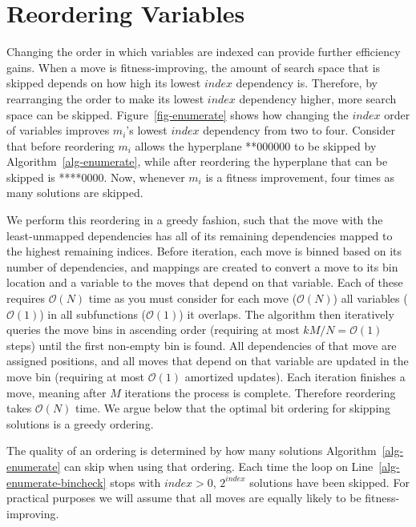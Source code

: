 \documentclass[runningheads,a4paper]{llncs}
\newcommand{\BigO}[1]{$\mathcal{O}{(#1)}$}
\begin{document}
\section{Reordering Variables}
\label{sec-reorder}
Changing the order in which variables are indexed can provide further efficiency gains.
When a move is fitness-improving,
the amount of search space that is skipped depends on how high its lowest $index$ dependency is. Therefore,
by rearranging the order to make its lowest $index$ dependency higher, more search space can be skipped. 
Figure~\ref{fig-enumerate} shows how changing the $index$ order of variables
improves $m_i$'s lowest $index$ dependency from two to four. Consider that before reordering $m_i$ allows the hyperplane
**000000 to be skipped by Algorithm~\ref{alg-enumerate}, while after reordering the hyperplane that can be skipped is ****0000.
Now, whenever $m_i$ is a fitness improvement, four times as many solutions are skipped.

We perform this reordering in a greedy fashion, such that the move with the
least-unmapped dependencies has all of its remaining dependencies mapped to the
highest remaining indices.
Before iteration, each move is binned based on its number of dependencies, and mappings
are created to convert a move to its bin location and a variable to the
moves that depend on that variable. Each of these requires \BigO{N} time
as you must consider for each move (\BigO{N}) all variables (\BigO{1})
in all subfunctions (\BigO{1}) it overlaps.
The algorithm then iteratively queries the move bins in ascending order
(requiring at most $kM/N=$\BigO{1} steps) until the first non-empty bin
is found. All dependencies of that move are assigned positions, and
all moves that depend on that variable are updated in the move bin
(requiring at most \BigO{1} amortized updates). Each iteration finishes
a move, meaning after $M$ iterations the process is complete. Therefore
reordering takes \BigO{N} time.
We argue below that the optimal bit ordering for skipping solutions
is a greedy ordering.

The quality of an ordering is determined by how many solutions
Algorithm~\ref{alg-enumerate} can skip when using that ordering.
Each time the loop on Line~\ref{alg-enumerate-bincheck} stops with $index>0$,
$2^{index}$ solutions have been skipped. For practical purposes we will
assume that all moves are equally likely to be fitness-improving.
\end{document}
